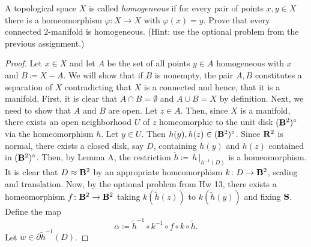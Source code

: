 \newpage
\begin{problem}[B]
A topological space $X$ is called \emph{homogeneous} if for every pair of
points $x,y\in X$ there is a homeomorphism $\varphi\colon X\to X$ with
$\varphi(x)=y$. Prove that every connected $2$-manifold is
homogeneous. (Hint: use the optional problem from the previous assignment.)
\end{problem}
\begin{proof}
Let $x\in X$ and let $A$ be the set of all points $y\in A$ homogeneous with
$x$ and $B\coloneqq X\minus A$. We will show that if $B$ is nonempty, the
pair $A,B$ constitutes a separation of $X$ contradicting that $X$ is a
connected and hence, that it is a manifold. First, it is clear that $A\cap
B=\emptyset$ and $A\cup B=X$ by definition. Next, we need to show that $A$
and $B$ are open. Let $z\in A$. Then, since $X$ is a manifold, there exists
an open neighborhood $U$ of $z$ homeomorphic to the unit disk
$(\mathbf{B}^2)^\circ$ via the homeomorphism $h$. Let $y\in U$. Then
$h(y),h(z)\in (\mathbf{B}^2)^\circ$. Since $\mathbf{R}^2$ is normal, there exists a
closed disk, say $D$, containing $h(y)$ and $h(z)$ contained in
$(\mathbf{B}^2)^\circ$. Then, by Lemma A, the restriction $\tilde
h\coloneqq\left.\,h\,\right|_{h^{-1}(D)}$ is a homeomorphism. It is clear
that $D\approx\mathbf{B}^2$ by an appropriate homeomorphism $k\colon D\to\mathbf{B}^2$,
scaling and translation. Now, by the optional problem from Hw 13, there
exists a homeomorphism $f\colon\mathbf{B}^2\to\mathbf{B}^2$ taking $k(\tilde h(z))$ to
$k(\tilde h(y))$ and fixing $\mathbf{S}$. Define the map
\begin{equation}
\label{eq:7}
\alpha\coloneqq\tilde h^{-1}\circ k^{-1}\circ f\circ k\circ\tilde h.
\end{equation}
Let $w\in\partial\tilde h^{-1}(D)$.
\end{proof}

